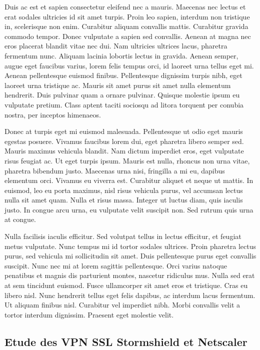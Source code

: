 \documentclass{report}
\begin{document}
Duis ac est et sapien consectetur eleifend nec a mauris. Maecenas nec lectus et erat sodales ultricies id sit amet turpis. Proin leo sapien, interdum non tristique in, scelerisque non enim. Curabitur aliquam convallis mattis. Curabitur gravida commodo tempor. Donec vulputate a sapien sed convallis. Aenean at magna nec eros placerat blandit vitae nec dui. Nam ultricies ultrices lacus, pharetra fermentum nunc. Aliquam lacinia lobortis lectus in gravida. Aenean semper, augue eget faucibus varius, lorem felis tempus orci, id laoreet urna tellus eget mi. Aenean pellentesque euismod finibus. Pellentesque dignissim turpis nibh, eget laoreet urna tristique ac. Mauris sit amet purus sit amet nulla elementum hendrerit. Duis pulvinar quam a ornare pulvinar. Quisque molestie ipsum eu vulputate pretium. Class aptent taciti sociosqu ad litora torquent per conubia nostra, per inceptos himenaeos.

Donec at turpis eget mi euismod malesuada. Pellentesque ut odio eget mauris egestas posuere. Vivamus faucibus lorem dui, eget pharetra libero semper sed. Mauris maximus vehicula blandit. Nam dictum imperdiet eros, eget vulputate risus feugiat ac. Ut eget turpis ipsum. Mauris est nulla, rhoncus non urna vitae, pharetra bibendum justo. Maecenas urna nisi, fringilla a mi eu, dapibus elementum orci. Vivamus eu viverra est. Curabitur aliquet et neque ut mattis. In euismod, leo eu porta maximus, nisl risus vehicula purus, vel accumsan lectus nulla sit amet quam. Nulla et risus massa. Integer ut luctus diam, quis iaculis justo. In congue arcu urna, eu vulputate velit suscipit non. Sed rutrum quis urna at congue.

Nulla facilisis iaculis efficitur. Sed volutpat tellus in lectus efficitur, et feugiat metus vulputate. Nunc tempus mi id tortor sodales ultrices. Proin pharetra lectus purus, sed vehicula mi sollicitudin sit amet. Duis pellentesque purus eget convallis suscipit. Nunc nec mi at lorem sagittis pellentesque. Orci varius natoque penatibus et magnis dis parturient montes, nascetur ridiculus mus. Nulla sed erat at sem tincidunt euismod. Fusce ullamcorper sit amet eros et tristique. Cras eu libero nisl. Nunc hendrerit tellus eget felis dapibus, ac interdum lacus fermentum. Ut aliquam finibus nisl. Curabitur vel imperdiet nibh. Morbi convallis velit a tortor interdum dignissim. Praesent eget molestie velit.

\subsection{Etude des VPN SSL Stormshield et Netscaler}
\end{document}
